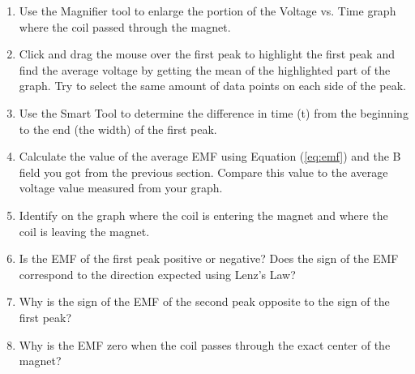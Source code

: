 \begin{enumerate}
 \item Use the Magnifier tool to enlarge the portion of the Voltage vs. Time graph where the coil passed through the magnet.

 \item Click and drag the mouse over the first peak to highlight the first peak and find the average voltage by getting the mean of the highlighted part of the graph. Try to select the same amount of data points on each side of the peak.

 \item Use the Smart Tool to determine the difference in time (t) from the beginning to the end (the width) of the first peak.

 \item Calculate the value of the average EMF using Equation (\ref{eq:emf}) and the B field you got from the previous section. Compare this value to the average voltage value measured from your graph.

 \item Identify on the graph where the coil is entering the magnet and where the coil is leaving the magnet.

 \item Is the EMF of the first peak positive or negative? Does the sign of the EMF correspond to the direction expected using Lenz's Law?

 \item Why is the sign of the EMF of the second peak opposite to the sign of the first peak?

 \item Why is the EMF zero when the coil passes through the exact center of the magnet?

\end{enumerate}
